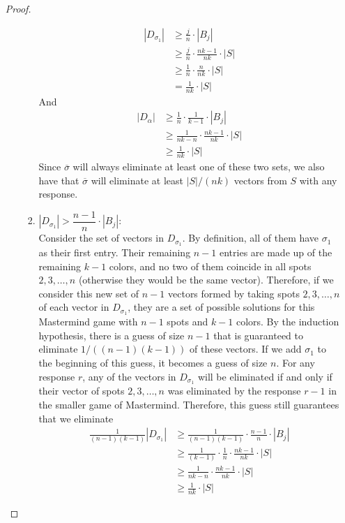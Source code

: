 \documentclass[12pt, a4paper]{article}
\begin{document}
\begin{enumerate}
\begin{proof}
\begin{enumerate}[label=]
\begin{enumerate}[label=\roman*.]
					\begin{align*}
					|D_{\sigma_1}| & \ge \frac{j}{n}\cdot|B_j|\\
					& \ge \frac{j}{n}\cdot\frac{nk-1}{nk}\cdot|S|\\
					& \ge \frac{1}{n}\cdot\frac{n}{nk}\cdot|S|\\
					& = \frac{1}{nk}\cdot|S|
					\end{align*}
				And
					\begin{align*}
					|D_\alpha| & \ge\frac{1}{n}\cdot\frac{1}{k-1}\cdot|B_j|\\
					& \ge \frac{1}{nk-n}\cdot\frac{nk-1}{nk}\cdot|S|\\
					& \ge \frac{1}{nk}\cdot|S|
					\end{align*}
				Since $\overline{\sigma}$ will always eliminate at least one of
				these two sets, we also have that $\overline{\sigma}$ will eliminate
				at least $|S|/(nk)$ vectors from $S$ with any response.
					
				\item $|D_{\sigma_1}|> \dfrac{n-1}{n}\cdot|B_j|$:\\
				Consider the set of vectors in $D_{\sigma_1}$. By definition,
				all of them have $\sigma_1$ as their first entry. Their remaining
				$n-1$ entries are made up of the remaining $k-1$ colors, and no two of
				them coincide in all spots $2, 3, \ldots, n$ (otherwise they would be
				the same vector). Therefore, if we consider this new set of $n-1$
				vectors formed by taking spots $2, 3, \ldots, n$ of each vector in
				$D_{\sigma_1}$, they are a set of possible solutions for this
				Mastermind game with $n-1$ spots and $k-1$ colors. By the induction
				hypothesis, there is a guess of size $n-1$ that is guaranteed to
				eliminate $1/((n-1)(k-1))$ of these vectors. If we add $\sigma_1$
				to the
				beginning of this guess, it becomes a guess of size $n$. For any
				response $r$, any of the vectors in $D_{\sigma_1}$ will be eliminated
				if and only if their vector of spots $2, 3, \ldots, n$ was eliminated
				by the response $r-1$ in the smaller game of Mastermind. Therefore,
				this guess still guarantees that we eliminate
				\begin{align*}
				\frac{1}{(n-1)(k-1)}|D_{\sigma_1}|
				& \ge \frac{1}{(n-1)(k-1)}\cdot\frac{n-1}{n}\cdot|B_j|\\
				& \ge \frac{1}{(k-1)}\cdot\frac{1}{n}
				\cdot\frac{nk-1}{nk}\cdot|S|\\
				& \ge \frac{1}{nk-n}\cdot\frac{nk-1}{nk}\cdot|S|\\
				& \ge \frac{1}{nk}\cdot|S|
				\end{align*}
				\end{enumerate}
			

\end{enumerate}
\end{proof}
\end{enumerate}
\end{document}
